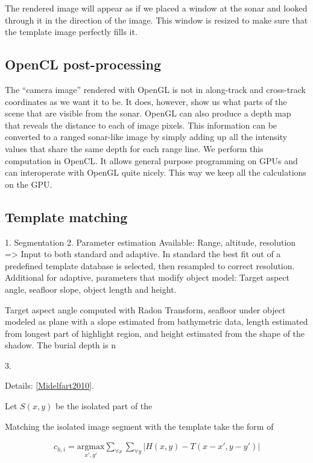 The rendered image will appear as if we placed a window at the sonar and looked through it in the direction of the image. This window is resized to make sure that the template image perfectly fills it.

\subsection{OpenCL post-processing}

The ``camera image'' rendered with OpenGL is not in along-track and cross-track coordinates as we want it to be. It does, however, show us what parts of the scene that are visible from the sonar. OpenGL can also produce a depth map that reveals the distance to each of image pixels. This information can be converted to a ranged sonar-like image by simply adding up all the intensity values that share the same depth for each range line. We perform this computation in OpenCL. It allows general purpose programming on GPUs and can interoperate with OpenGL quite nicely. This way we keep all the calculations on the GPU.


\subsection{Template matching}

1. Segmentation
2. Parameter estimation
   Available: Range, altitude, resolution => Input to both standard and adaptive. In standard the best fit out of a predefined template database is selected, then resampled to correct resolution.
   Additional for adaptive, parameters that modify object model: Target aspect angle, seafloor slope, object length and height.

   Target aspect angle computed with Radon Transform, seafloor under object modeled as plane with a slope estimated from bathymetric data, length estimated from longest part of highlight region, and height estimated from the shape of the shadow. The burial depth is n


   
3. 

   Details: \ref{Midelfart2010}.

Let $S(x,y)$ be the isolated part of the

Matching the isolated image segment with the template take the form of

\begin{align}
c_{h,i} = \underset{x',y'}{\text{argmax}} \sum\limits_{\forall x}\sum\limits_{\forall y} \big| H(x,y) - T(x-x',y-y') \big|
\end{align}

